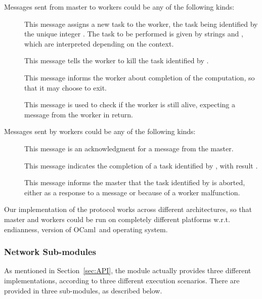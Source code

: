 \documentclass[a4paper,12pt]{article}
\newcommand{\Ocaml}{OCaml}
\begin{document}
Messages sent from master to workers could be any of the following kinds:
\begin{description}
\item[] This message assigns a
  new task to the worker, the task being identified by the unique
  integer . The task to be performed is given by strings 
  and , which are interpreted depending on the context.

\item[] This message tells the worker to kill the task
  identified by .

\item[] This message informs the worker about completion of
  the computation, so that it may choose to exit.

\item[] This message is used to check if the worker is still
  alive, expecting a  message from the worker in return.
\end{description}
Messages sent by workers could be any of the following kinds:
\begin{description}
\item[] This message is an acknowledgment for a 
  message from the master.

\item[] This message indicates the
  completion of a task identified by , with result .

\item[] This message informs the master that the
  task identified by  is aborted, either as a response to a
   message or because of a worker malfunction.
\end{description}
Our implementation of the protocol works across different
architectures, so that master and workers could be run on completely
different platforms w.r.t. endianness, version of \Ocaml\ and
operating system.

\subsubsection{Network Sub-modules} %

As mentioned in Section~\ref{sec:API}, the  module
actually provides three different implementations, according to three
different execution scenarios. There are provided in three
sub-modules, as described below.
\end{document}
